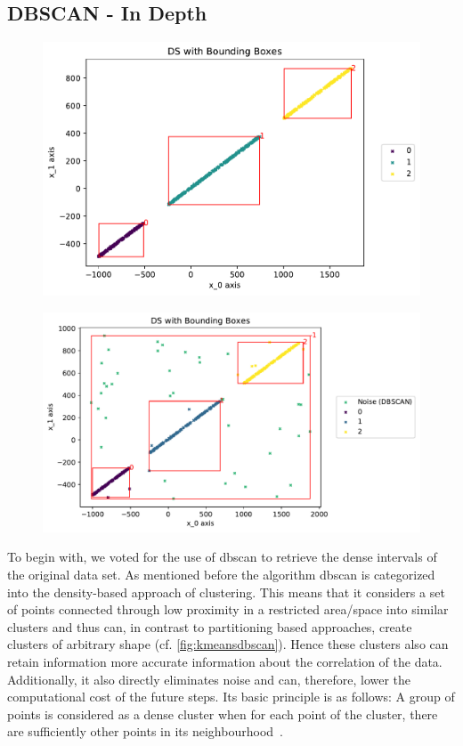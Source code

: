 \subsection{DBSCAN - In Depth}
\label{ssec:DBSCANindepth}
\begin{figure}
    \centering
    \begin{minipage}{.47\textwidth}
      \centering
      \includegraphics[width=.8\textwidth]{figures/DSwithDBSCANBoundingBoxes.pdf}
      \label{fig:cleandbscan}
    \end{minipage}%
    \begin{minipage}{.53 \textwidth}
      \centering
      \includegraphics[width=.8\textwidth]{figures/DBSCANwithNoise.pdf}
      \label{fig:noisydbscan}
    \end{minipage}
\end{figure}
To begin with, we voted for the use of \gls{dbscan} to retrieve the dense intervals of the original data set. 
As mentioned before the algorithm \gls{dbscan} is categorized into the density-based approach of clustering. This means that it considers a set of points connected through low proximity in a restricted area/space into similar clusters and thus can, in contrast to partitioning based approaches, create clusters of arbitrary shape (cf. \autoref{fig:kmeansdbscan}). Hence these clusters also can retain information more accurate information about the correlation of the data. Additionally, it also directly eliminates noise and can, therefore, lower the computational cost of the future steps. Its basic principle is as follows:
A group of points is considered as a dense cluster when for each point of the cluster, there are sufficiently other points in its neighbourhood~\cite{DBSCANEKSX96}.

